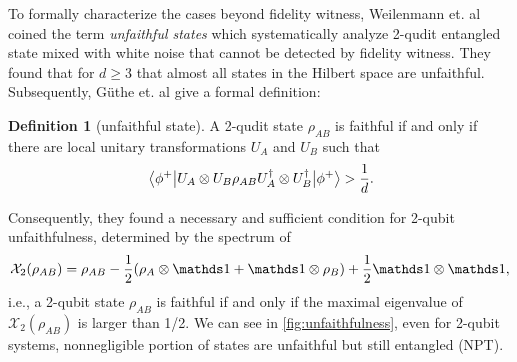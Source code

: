 \documentclass[
aps,
pra,
twocolumn,
floatfix,
]{revtex4-2}
\theoremstyle{plain}
\theoremstyle{definition}
\newtheorem{definition}{Definition}
\newcommand{\dm}{\rho}
\newcommand{\U}{U}
\begin{document}
To formally characterize the cases beyond fidelity witness, Weilenmann et. al \cite{weilenmannEntanglementDetectionMeasuring2020} coined the term \emph{unfaithful states} 
which systematically analyze 2-qudit entangled state mixed with white noise that cannot be detected by fidelity witness.
They found that for $d \ge 3$ that almost all states in the Hilbert space are unfaithful. 
Subsequently, G\"{u}the et. al \cite{guhneGeometryFaithfulEntanglement2021} \cite{riccardiExploringRelationshipFaithfulness2021} give a formal definition: 
\begin{definition}[unfaithful state]\label{def:unfaithful_state}
	A 2-qudit state $\dm_{AB}$ is faithful if and only if there are local unitary transformations $\U_A$ and $\U_B$ such that
	\begin{equation}
		\expval{\U_A\otimes\U_B \dm_{AB} \U_A^\dagger \otimes\U_B^\dagger}{\phi^+}
		> \frac{1}{d}.
	\end{equation}
\end{definition}
Consequently, they found a necessary and sufficient condition for 2-qubit unfaithfulness, determined by the spectrum of
\begin{equation}
	\mathcal{X}_2( \dm_{AB})=\rho_{AB}-\frac{1}{2}(\dm_{A}\otimes \identity + \identity \otimes \dm_{B})+\frac{1}{2} \identity \otimes \identity
	\label{eq:unfaithful_2qubit},
\end{equation}
i.e.,
a 2-qubit state $\dm_{AB}$ is faithful if and only if the maximal eigenvalue of $\mathcal{X}_2( \dm_{AB})$ is larger than 1/2.
We can see in \cref{fig:unfaithfulness}, even for 2-qubit systems, nonnegligible portion of states are unfaithful but still entangled (NPT).
\end{document}
